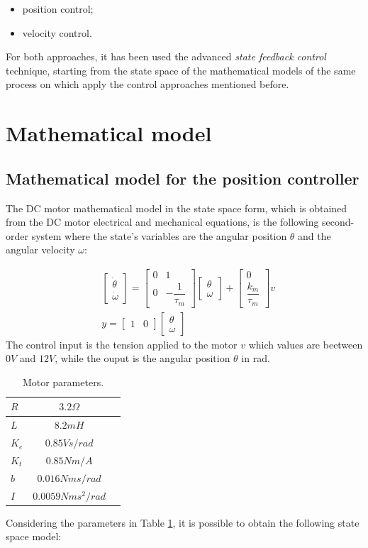 \documentclass[11pt,a4paper,oneside]{extarticle}
\newcommand\mtrx[1]{
    \begin{bmatrix}
        #1
    \end{bmatrix}
}
\begin{document}
\begin{itemize}
	\item position control;
	\item velocity control.
\end{itemize}

For both approaches, it has been used the advanced 
\textit{state feedback control} technique, starting from the state 
space of the mathematical models of the same process on which apply 
the control approaches mentioned before.

\section{Mathematical model}
\subsection{Mathematical model for the position controller}
The DC motor mathematical model in the state space form, which is 
obtained from the DC motor electrical and mechanical equations, is the
following second-order system where the state's variables are the 
angular position $\theta$ and the angular velocity $\omega$:

\begin{equation}
	\begin{split}
		&\mtrx{\dot{\theta}\\ \dot{\omega}}= \mtrx{0 & 1\\ 0 & -\dfrac{1}{\tau_m}}\mtrx{\theta\\ \omega} + \mtrx{0\\ \dfrac{k_m}{\tau_m}}v\\
		&y = \mtrx{1 & 0}\mtrx{\theta\\ \omega}
	\end{split}
\end{equation}
The control input is the tension applied to the motor $v$ 
which values are beetween $0V$ and $12V$, while the ouput is the
angular position $\theta$ in rad.

\begin{table}[H]
	\centering
	\begin{tabular}{|l|c|l|}
		\hline
		$R$   & $3.2\Omega$       \\ \hline
		$L$   & $8.2mH$           \\ \hline
		$K_e$ & $0.85Vs/rad$      \\ \hline
		$K_t$ & $0.85Nm/A$        \\ \hline
		$b$   & $0.016Nms/rad$    \\ \hline
		$I$   & $0.0059Nms^2/rad$ \\ \hline
	\end{tabular}
	\caption{Motor parameters.}
	\label{tab:motor_parameters}
\end{table}
Considering the parameters in Table \ref{tab:motor_parameters}, it is
possible to obtain the following state space model:
\end{document}
